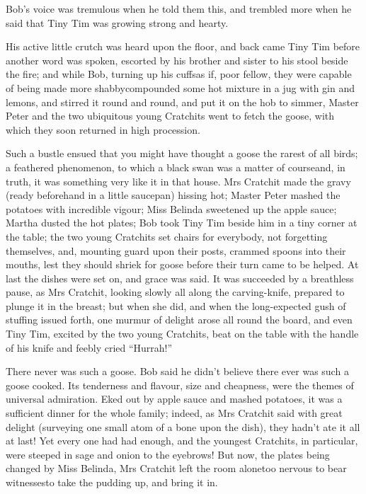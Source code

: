 \documentclass[paper=5.5in:8.5in,BCOR=10mm,twoside,DIV=15,12pt,usegeometry,openany]{scrbook} %
\begin{document}
Bob's voice was tremulous when he told them this, and trembled more when he said that Tiny Tim was growing strong and hearty.

His active little crutch was heard upon the floor, and back came Tiny Tim before another word was spoken, escorted by his brother and sister to his stool beside the fire; and while Bob, turning up his cuffs\textemdash as if, poor fellow, they were capable of being made more shabby\textemdash compounded some hot mixture in a jug with gin and lemons, and stirred it round and round, and put it on the hob to simmer, Master Peter and the two ubiquitous young Cratchits went to fetch the goose, with which they soon returned in high procession.


Such a bustle ensued that you might have thought a goose the rarest of all birds; a feathered phenomenon, to which a black swan was a matter of course\textemdash and, in truth, it was something very like it in that house. Mrs Cratchit made the gravy (ready beforehand in a little saucepan) hissing hot; Master Peter mashed the potatoes with incredible vigour; Miss Belinda sweetened up the apple sauce; Martha dusted the hot plates; Bob took Tiny Tim beside him in a tiny corner at the table; the two young Cratchits set chairs for everybody, not forgetting themselves, and, mounting guard upon their posts, crammed spoons into their mouths, lest they should shriek for goose before their turn came to be helped. At last the dishes were set on, and grace was said. It was succeeded by a breathless pause, as Mrs Cratchit, looking slowly all along the carving-knife, prepared to plunge it in the breast; but when she did, and when the long-expected gush of stuffing issued forth, one murmur of delight arose all round the board, and even Tiny Tim, excited by the two young Cratchits, beat on the table with the handle of his knife and feebly cried \enquote{Hurrah!}

There never was such a goose. Bob said he didn't believe there ever was such a goose cooked. Its tenderness and flavour, size and cheapness, were the themes of universal admiration. Eked out by apple sauce and mashed potatoes, it was a sufficient dinner for the whole family; indeed, as Mrs Cratchit said with great delight (surveying one small atom of a bone upon the dish), they hadn't ate it all at last! Yet every one had had enough, and the youngest Cratchits, in particular, were steeped in sage and onion to the eyebrows! But now, the plates being changed by Miss Belinda, Mrs Cratchit left the room alone\textemdash too nervous to bear witnesses\textemdash to take the pudding up, and bring it in.
\end{document}
